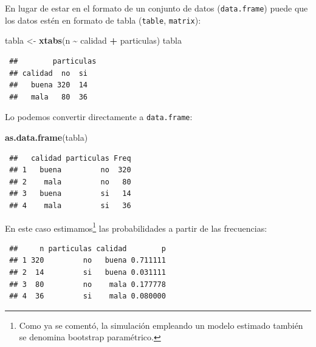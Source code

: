 \documentclass[
  spanish,
  10pt,
]{book}
\newenvironment{Shaded}{\begin{snugshade}}{\end{snugshade}}
\newcommand{\FunctionTok}[1]{\textcolor[rgb]{0.13,0.29,0.53}{\textbf{#1}}}
\newcommand{\NormalTok}[1]{#1}
\newcommand{\OtherTok}[1]{\textcolor[rgb]{0.56,0.35,0.01}{#1}}
\newcommand{\SpecialCharTok}[1]{\textcolor[rgb]{0.81,0.36,0.00}{\textbf{#1}}}
\theoremstyle{break}
\theoremstyle{nonumberplain}
\let\oldfootnote\footnote
\renewcommand\footnote[1]{\oldfootnote{\hspace{2mm}#1}}
\begin{document}
En lugar de estar en el formato de un conjunto de datos (\texttt{data.frame}) puede que los datos estén en formato de tabla (\texttt{table}, \texttt{matrix}):

\begin{Shaded}
\begin{Highlighting}[]
\NormalTok{tabla }\OtherTok{\textless{}{-}} \FunctionTok{xtabs}\NormalTok{(n }\SpecialCharTok{\textasciitilde{}}\NormalTok{ calidad }\SpecialCharTok{+}\NormalTok{ particulas)}
\NormalTok{tabla}
\end{Highlighting}
\end{Shaded}

\begin{verbatim}
 ##        particulas
 ## calidad  no  si
 ##   buena 320  14
 ##   mala   80  36
\end{verbatim}

Lo podemos convertir directamente a \texttt{data.frame}:

\begin{Shaded}
\begin{Highlighting}[]
\FunctionTok{as.data.frame}\NormalTok{(tabla)}
\end{Highlighting}
\end{Shaded}

\begin{verbatim}
 ##   calidad particulas Freq
 ## 1   buena         no  320
 ## 2    mala         no   80
 ## 3   buena         si   14
 ## 4    mala         si   36
\end{verbatim}

En este caso estimamos\footnote{Como ya se comentó, la simulación empleando un modelo estimado también se denomina bootstrap paramétrico.} las probabilidades a partir de las frecuencias:

\begin{Shaded}
\end{Shaded}

\begin{verbatim}
 ##     n particulas calidad        p
 ## 1 320         no   buena 0.711111
 ## 2  14         si   buena 0.031111
 ## 3  80         no    mala 0.177778
 ## 4  36         si    mala 0.080000
\end{verbatim}
\end{document}
